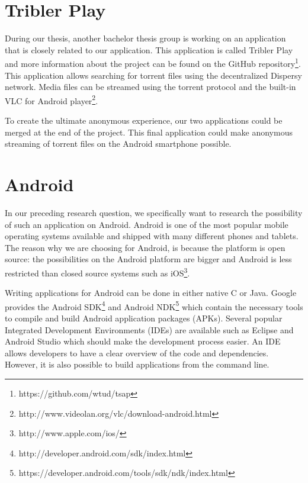 	\section{Tribler Play}
		During our thesis, another bachelor thesis group is working on an application that is closely related to our application. This application is called Tribler Play and more information about the project can be found on the GitHub repository\footnote{https://github.com/wtud/tsap}. This application allows searching for torrent files using the decentralized Dispersy network. Media files can be streamed using the torrent protocol and the built-in VLC for Android player\footnote{http://www.videolan.org/vlc/download-android.html}.
		
		To create the ultimate anonymous experience, our two applications could be merged at the end of the project. This final application could make anonymous streaming of torrent files on the Android smartphone possible.
		
	\section{Android}
		In our preceding research question, we specifically want to research the possibility of such an application on Android. Android is one of the most popular mobile operating systems available and shipped with many different phones and tablets. The reason why we are choosing for Android, is because the platform is open source: the possibilities on the Android platform are bigger and Android is less restricted than closed source systems such as iOS\footnote{http://www.apple.com/ios/}.
		
		Writing applications for Android can be done in either native C or Java. Google provides the Android SDK\footnote{http://developer.android.com/sdk/index.html} and Android NDK\footnote{https://developer.android.com/tools/sdk/ndk/index.html} which contain the necessary tools to compile and build Android application packages (APKs). Several popular Integrated Development Environments (IDEs) are available such as Eclipse and Android Studio which should make the development process easier. An IDE allows developers to have a clear overview of the code and dependencies. However, it is also possible to build applications from the command line.